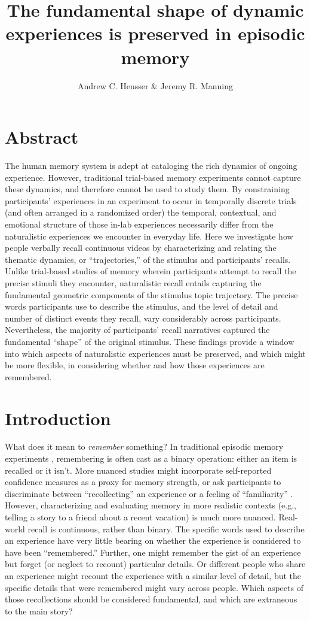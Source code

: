 \documentclass{article}
\title{The fundamental shape of dynamic experiences is preserved in episodic memory}
\author{Andrew C. Heusser \& Jeremy R. Manning}
\begin{document}
\maketitle

\section{Abstract}
{
The human memory system is adept at cataloging the rich dynamics of ongoing experience. However, traditional trial-based memory experiments cannot capture these dynamics, and therefore cannot be used to study them.  By constraining participants' experiences in an experiment to occur in temporally discrete trials (and often arranged in a randomized order) the temporal, contextual, and emotional structure of those in-lab experiences necessarily differ from the naturalistic experiences we encounter in everyday life.  Here we investigate how people verbally recall continuous videos by characterizing and relating the thematic dynamics, or ``trajectories,'' of the stimulus and participants' recalls.  Unlike trial-based studies of memory wherein participants attempt to recall the precise stimuli they encounter, naturalistic recall entails capturing the fundamental geometric components of the stimulus topic trajectory.  The precise words participants use to describe the stimulus, and the level of detail and number of distinct events they recall, vary considerably across participants.  Nevertheless, the majority of participants' recall narratives captured the fundamental ``shape'' of the original stimulus.  These findings provide a window into which aspects of naturalistic experiences must be preserved, and which might be more flexible, in considering whether and how those experiences are remembered.

\section{Introduction}

What does it mean to \textit{remember} something? In traditional episodic memory experiments \citep[e.g., list-learning or trial-based experiments;][]{Murd62a, Kaha96}, remembering is often cast as a binary operation: either an item is recalled or it isn't. More nuanced studies might incorporate self-reported confidence measures as a proxy for memory strength, or ask participants to discriminate between ``recollecting'' an experience or a feeling of ``familiarity'' \citep{Yone02}. However, characterizing and evaluating memory in more realistic contexts (e.g., telling a story to a friend about a recent vacation) is much more nuanced. Real-world recall is continuous, rather than binary.  The specific words used to describe an experience have very little bearing on whether the experience is considered to have been ``remembered.''  Further, one might remember the gist of an experience but forget (or neglect to recount) particular details.  Or different people who share an experience might recount the experience with a similar level of detail, but the specific details that were remembered might vary across people.  Which aspects of those recollections should be considered fundamental, and which are extraneous to the main story?

}
\end{document}
